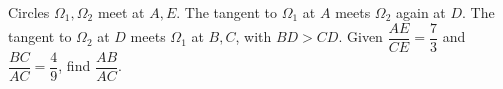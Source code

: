 Circles $\Omega_1,\Omega_2$ meet at $A,E$. The tangent to $\Omega_1$ at $A$ meets $\Omega_2$ again at $D$. The tangent to $\Omega_2$ at $D$ meets $\Omega_1$ at $B,C$, with $BD>CD$. Given $\dfrac{AE}{CE}=\dfrac{7}{3}$ and $\dfrac{BC}{AC}=\dfrac{4}{9}$, find $\dfrac{AB}{AC}$.
